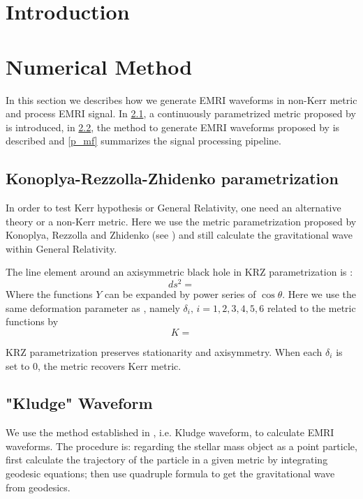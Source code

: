 \documentclass{article}
\begin{document}
\section{Introduction}
\section{Numerical Method}
In this section we describes how we generate EMRI waveforms in non-Kerr metric and process EMRI signal. In \ref{p_krz}, a continuously parametrized metric proposed by \cite{KRZ} is introduced, in \ref{p_kludge}, the method to generate EMRI waveforms proposed by \cite{kludge} is described and \ref{p_mf} summarizes the signal processing pipeline.
\subsection{Konoplya-Rezzolla-Zhidenko parametrization}
\label{p_krz}
In order to test Kerr hypothesis or General Relativity, one need an alternative theory or a non-Kerr metric. Here we use the metric parametrization proposed by Konoplya, Rezzolla and Zhidenko (see \cite{KRZ}) and still calculate the gravitational wave within General Relativity. 

The line element around an axisymmetric black hole in KRZ parametrization is \cite{KRZ}:
\begin{equation}
	ds^2=
\end{equation}
Where the functions $Y$ can be expanded by power series of $\cos\theta$. Here we use the same deformation parameter as \cite{cosimoKRZ}, namely $\delta_i, \, i=1,2,3,4,5,6$ related to the metric functions by
\begin{equation}
K=	
\end{equation}

KRZ parametrization preserves stationarity and axisymmetry. When each $\delta_i$ is set to 0, the metric recovers Kerr metric.

\subsection{"Kludge" Waveform}
\label{p_kludge}
We use the method established in \cite{kludge}, i.e. Kludge waveform, to calculate EMRI waveforms. The procedure is: regarding the stellar mass object as a point particle, first calculate the trajectory of the particle in a given metric by integrating geodesic equations; then use quadruple formula to get the gravitational wave from geodesics.
\end{document}

